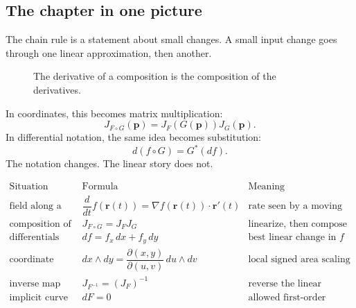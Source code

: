\subsection{The chapter in one picture}

The chain rule is a statement about small changes.  A small input change goes through
one linear approximation, then another.

\begin{figure}[h]
\centering
{}
\caption{The derivative of a composition is the composition of the derivatives.}
\end{figure}

In coordinates, this becomes matrix multiplication:
\[
    J_{F\circ G}(\mathbf p)=J_F(G(\mathbf p))J_G(\mathbf p).
\]
In differential notation, the same idea becomes substitution:
\[
    d(f\circ G)=G^*(df).
\]
The notation changes.  The linear story does not.

\[
\begin{array}{c|c|c}
\text{Situation} & \text{Formula} & \text{Meaning} \\ \hline
\text{field along a curve}
&
\dfrac{d}{dt}f(\mathbf r(t))
=
\nabla f(\mathbf r(t))\cdot\mathbf r'(t)
&
\text{rate seen by a moving observer}
\\[3mm]
\text{composition of maps}
&
J_{F\circ G}=J_FJ_G
&
\text{linearize, then compose}
\\[3mm]
\text{differentials}
&
df=f_x\,dx+f_y\,dy
&
\text{best linear change in }f
\\[3mm]
\text{coordinate change}
&
dx\wedge dy=
\dfrac{\partial(x,y)}{\partial(u,v)}\,du\wedge dv
&
\text{local signed area scaling}
\\[4mm]
\text{inverse map}
&
J_{F^{-1}}=
(J_F)^{-1}
&
\text{reverse the linear approximation}
\\[3mm]
\text{implicit curve or surface}
&
dF=0
&
\text{allowed first-order motions stay on the constraint}
\end{array}
\]

